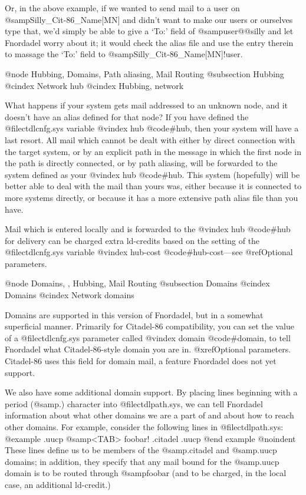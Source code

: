 {{{{Or, in the above example, if we wanted to send mail to
a user on @samp{Silly_Cit-86_Name[MN]} and didn't want to make our users
or ourselves type that, we'd simply be able to give a `To:' field
of @samp{user@@silly} and let Fnordadel worry about it; it would
check the alias file and use the entry therein to massage the `To:'
field to @samp{Silly_Cit-86_Name[MN]!user}.

@node Hubbing, Domains, Path aliasing, Mail Routing
@subsection Hubbing
@cindex Network hub
@cindex Hubbing, network

What happens if your system gets mail addressed to an
unknown node, and it doesn't have an alias defined for that node?
If you have defined the @file{ctdlcnfg.sys} variable
@vindex hub
@code{#hub}, then your
system will have a last resort.  All mail which cannot be dealt
with either by direct connection with the target system, or by
an explicit path in the message in which the first node in the
path is directly connected, or by path aliasing, will be
forwarded to the system defined as your
@vindex hub
@code{#hub}.  This system
(hopefully) will be better able to deal with the mail than yours
was, either because it is connected to more systems directly, or
because it has a more extensive path alias file than you have.

Mail which is entered locally and is forwarded to the
@vindex hub
@code{#hub} for delivery can be charged extra ld-credits based on the
setting of the @file{ctdlcnfg.sys} variable
@vindex hub-cost
@code{#hub-cost}---see
@ref{Optional parameters}.

@node Domains,  , Hubbing, Mail Routing
@subsection Domains
@cindex Domains
@cindex Network domains

Domains are supported in this version of Fnordadel, but in
a somewhat superficial manner.  Primarily for Citadel-86 compatibility,
you can set the value of a @file{ctdlcnfg.sys} parameter called
@vindex domain
@code{#domain}, to tell Fnordadel what Citadel-86-style domain you are in.
@xref{Optional parameters}.  Citadel-86 uses this field for domain mail,
a feature Fnordadel does not yet support.

We also have some additional domain support.  By placing lines beginning
with a period (@samp{.}) character into @file{ctdlpath.sys}, we can tell
Fnordadel information about what other domains we are a part of and
about how to reach other domains.  For example, consider the
following lines in @file{ctdlpath.sys}:
@example
.uucp @samp{<TAB>} foobar!%
.citadel
.uucp
@end example
@noindent
These lines define us to be members of the @samp{.citadel} and
@samp{.uucp} domains; in addition, they specify that any mail bound for
the @samp{.uucp} domain is to be routed through @samp{foobar} (and to be
charged, in the local case, an additional ld-credit.)

}}}}
